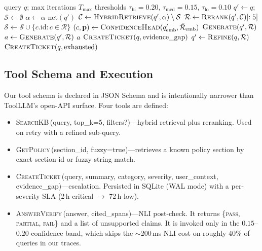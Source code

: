 \documentclass[11pt,a4paper,twocolumn]{article}
\begin{document}
\begin{algorithm}[t]
\caption{CGAL---Confidence-Gated Action Loop}\label{alg:cgal}
\small
\begin{algorithmic}[1]
\Require query $q$; max iterations $T_{\max}$
\Statex thresholds $\tau_{\text{hi}}{=}0.20$, $\tau_{\text{med}}{=}0.15$, $\tau_{\text{lo}}{=}0.10$
\State $q' \gets q$; $\mathcal{S} \gets \emptyset$ 
  \State $\alpha \gets \alpha\text{-net}(q')$
  \State $\mathcal{C} \gets \textsc{HybridRetrieve}(q', \alpha) \setminus \mathcal{S}$
  \State $\mathcal{R} \gets \textsc{Rerank}(q', \mathcal{C})[:5]$
  \State $\mathcal{S} \gets \mathcal{S}\cup\{c.\text{id}: c\in\mathcal{R}\}$
  \State $(c, \mathbf{p}) \gets \textsc{ConfidenceHead}(q'_{\text{emb}},
\bar{\mathcal{R}}_{\text{emb}})$
     \State \Return $\textsc{Generate}(q', \mathcal{R})$
     \State $a \gets \textsc{Generate}(q', \mathcal{R})$
        \State \Return $a$
     \EndIf
     \State \Return $\textsc{CreateTicket}(q, \text{evidence\_gap})$
  \EndIf
  \State $q' \gets \textsc{Refine}(q, \mathcal{R})$
\EndFor
\State \Return $\textsc{CreateTicket}(q, \text{exhausted})$
\end{algorithmic}
\end{algorithm}

\subsection{Tool Schema and Execution}\label{sec:tools}

Our tool schema is declared in JSON Schema and is intentionally narrower
than ToolLLM's open-API surface. Four tools are defined:

\begin{itemize}
\item \textsc{SearchKB}\,(query, top\_k=5, filters?)---hybrid retrieval
plus reranking. Used on retry with a refined sub-query.
\item \textsc{GetPolicy}\,(section\_id, fuzzy=true)---retrieves a known
policy section by exact section id or fuzzy string match.
\item \textsc{CreateTicket}\,(query, summary, category, severity,
user\_context, evidence\_gap)---escalation. Persisted in SQLite (WAL
mode) with a per-severity SLA (2\,h critical $\rightarrow$ 72\,h low).
\item \textsc{AnswerVerify}\,(answer, cited\_spans)---NLI post-check.
It returns \{\textsc{pass}, \textsc{partial}, \textsc{fail}\} and a list
of unsupported claims. It is invoked only in the $0.15$--$0.20$ confidence band, which skips the
$\sim$200\,ms NLI cost on roughly 40\% of queries in our traces.
\end{itemize}
\end{document}
